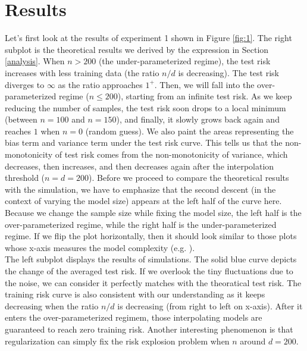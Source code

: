 \documentclass{article}
\begin{document}
\section{Results} \label{Results}
Let's first look at the results of experiment 1 shown in Figure \ref{fig:1}. The right subplot is the theoretical results we derived by the expression in Section \ref{analysis}. When $n > 200$ (the under-parameterized regime), the test risk increases with less training data (the ratio $n/d$ is decreasing). The test risk diverges to $\infty$ as the ratio approaches $1^+$. Then, we will fall into the over-parameterized regime ($n \leq 200$), starting from an infinite test risk. As we keep reducing the number of samples, the test risk soon drops to a local minimum (between $n=100$ and $n=150$), and finally, it slowly grows back again and reaches $1$ when $n = 0$ (random guess). We also paint the areas representing the bias term and variance term under the test risk curve. This tells us that the non-monotonicity of test risk comes from the non-monotonicity of variance, which decreases, then increases, and then decreases again after the interpolation threshold ($n = d = 200$). Before we proceed to compare the theoretical results with the simulation, we have to emphasize that the second descent (in the context of varying the model size) appears at the left half of the curve here. Because we change the sample size while fixing the model size, the left half is the over-parameterized regime, while the right half is the under-parameterized regime. If we flip the plot horizontally, then it should look similar to those plots whose x-axis measures the model complexity (e.g. \cite{belkin2019reconciling}).\\

\vspace{-3mm}
The left subplot displays the results of simulations. The solid blue curve depicts the change of the averaged test risk. If we overlook the tiny fluctuations due to the noise, we can consider it perfectly matches with the theoratical test risk. The training risk curve is also consistent with our understanding as it keeps decreasing when the ratio $n/d$ is decreasing (from right to left on x-axis). After it enters the over-parameterized regimem, those interpolating models are guaranteed to reach zero training risk. Another interesting phenomenon is that regularization can simply fix the risk explosion problem when $n$ around $d = 200$.
\end{document}
